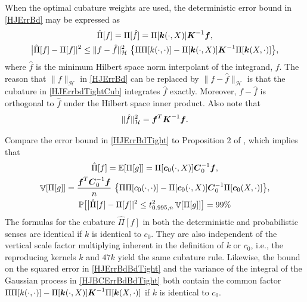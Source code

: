 \documentclass[sts]{imsart}
\numberwithin{equation}{section}
\theoremstyle{plain}
\newcommand{\calH}{\mathcal{H}}
\newcommand{\vC}{\boldsymbol{C}}
\DeclareMathOperator{\Var}{\mathbb{V}}
\newcommand{\BOGOS}{\citetalias{BriEtal18a}}%
\begin{document}
When the optimal cubature weights are used, the deterministic error bound in \eqref{HJErrBd} may be expressed as
\begin{gather} 
    \label{HJErrbdTightCub}
    \hat{\Pi}[f] = \Pi[\hat{f}] = \Pi[\vk(\cdot, X)] \vK^{-1} \vf, \\
    \label{HJErrBdBdTight}
    \bigl \lvert \hat{\Pi}[f] - \Pi[f] \rvert^2 \le \lVert f - \hat{f}  \rVert_{\calH}^2 \ \bigl \{ \Pi\Pi[k(\cdot,\cdot)] - \Pi[\vk(\cdot, X)]\vK^{-1} \Pi[\vk(X,\cdot)]\bigr \} ,
\end{gather}
where $\hat{f}$ is the minimum Hilbert space norm interpolant of the integrand, $f$.  The reason that $\lVert f \rVert_{\calH}$ in \eqref{HJErrBd} can be replaced by $\lVert f - \hat{f} \rVert_{\calH}$ is that the cubature in \eqref{HJErrbdTightCub} integrates $\hat{f}$ exactly. Moreover, $f - \hat{f}$ is orthogonal to $\hat{f}$ under the Hilbert space inner product.  Also note that
\begin{equation} \label{HJErrBdTight}
   \lVert \hat{f}  \rVert^2_{\calH} = \vf^T \vK^{-1} \vf.
\end{equation}

Compare the error bound in \eqref{HJErrBdTight} to Proposition 2 of \BOGOS{}, which implies that 
\begin{gather} 
\label{HJBCErrbdTightCub}
\nonumber
    \hat{\Pi}[f] = \Ex[\Pi[g]] = \Pi[\vc_0(\cdot, X)] \vC_0^{-1} \vf , \\
    \nonumber
    \Var[\Pi[g]] = \frac{\vf^T \vC_0^{-1} \vf}{n} \ \bigl \{ \Pi\Pi[c_0(\cdot,\cdot)] - \Pi[\vc_0(\cdot, X)]\vC_0^{-1} \Pi[\vc_0(X,\cdot)] \bigr \} , \\
    \label{HJBCErrBdBdTight}
    \Prob\bigl[ \bigl \lvert \hat{\Pi}[f] - \Pi[f] \rvert^2 \le t_{0.995,n}^2 \Var[\Pi[g]] \bigr] = 99\%
\end{gather}
The formulas for the cubature $\hat{\Pi}[f]$ in both the deterministic and probabilistic senses are identical if $k$ is identical to $c_0$.  They are also independent of the vertical scale factor multiplying inherent in the definition of $k$ or $c_0$, i.e., the reproducing kernels $k$ and $47k$ yield the same cubature rule.  Likewise, the bound on the squared error in \eqref{HJErrBdBdTight} and the variance of the integral of the Gaussian process in \eqref{HJBCErrBdBdTight} both contain the common factor $\Pi\Pi[k(\cdot,\cdot)] - \Pi[\boldsymbol{k}(\cdot, X)]\boldsymbol{K}^{-1} \Pi[\boldsymbol{k}(X,\cdot)]$ if $k$ is identical to $c_0$.
\end{document}
